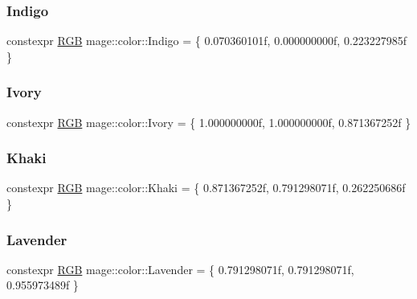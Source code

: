\mbox{\label{namespacemage_1_1color_a6c11642f5d2e292242db7ae8098ad2fe}} 
\subsubsection{\texorpdfstring{Indigo}{Indigo}}
{\footnotesize\ttfamily constexpr \mbox{\hyperlink{structmage_1_1_r_g_b}{R\+GB}} mage\+::color\+::\+Indigo = \{ 0.\+070360101f, 0.\+000000000f, 0.\+223227985f \}}

\mbox{\label{namespacemage_1_1color_a523d55e266b6dd337cd2865ee29754fc}} 
\subsubsection{\texorpdfstring{Ivory}{Ivory}}
{\footnotesize\ttfamily constexpr \mbox{\hyperlink{structmage_1_1_r_g_b}{R\+GB}} mage\+::color\+::\+Ivory = \{ 1.\+000000000f, 1.\+000000000f, 0.\+871367252f \}}

\mbox{\label{namespacemage_1_1color_a2be9259999ab5e4e4e3c46c0c12cd5d7}} 
\subsubsection{\texorpdfstring{Khaki}{Khaki}}
{\footnotesize\ttfamily constexpr \mbox{\hyperlink{structmage_1_1_r_g_b}{R\+GB}} mage\+::color\+::\+Khaki = \{ 0.\+871367252f, 0.\+791298071f, 0.\+262250686f \}}

\mbox{\label{namespacemage_1_1color_aa245a4aee08d18691655685f3918491d}} 
\subsubsection{\texorpdfstring{Lavender}{Lavender}}
{\footnotesize\ttfamily constexpr \mbox{\hyperlink{structmage_1_1_r_g_b}{R\+GB}} mage\+::color\+::\+Lavender = \{ 0.\+791298071f, 0.\+791298071f, 0.\+955973489f \}}

